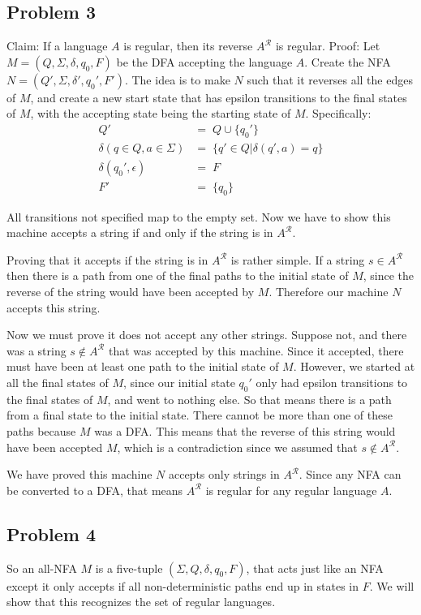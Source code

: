 \documentclass[english]{article}
\begin{document}
\subsection*{Problem 3}
Claim: If a language $A$ is regular, then its reverse $A^\mathcal{R}$ is regular.
Proof:
Let $M = (Q,\Sigma,\delta,q_0,F)$ be the DFA accepting the language $A$. Create the NFA $N = (Q',\Sigma,\delta',q_0',F')$. The idea is to make $N$ such that it reverses all the edges of $M$, and create a new start state that has epsilon transitions to the final states of $M$, with the accepting state being the starting state of $M$. Specifically:
\begin{align*}
                           Q' &=\; Q \cup \{q_0'\} \\
 \delta(q \in Q,a \in \Sigma) &=\; \{ q' \in Q | \delta(q',a) = q \} \\
        \delta(q_0',\epsilon) &=\; F \\
                           F' &=\; \{q_0\}
\end{align*}

All transitions not specified map to the empty set. Now we have to show this machine accepts a string if and only if the string is in $A^\mathcal{R}$.

Proving that it accepts if the string is in $A^\mathcal{R}$ is rather simple. If a string $s \in A^\mathcal{R}$ then there is a path from one of the final paths to the initial state of $M$, since the reverse of the string would have been accepted by $M$. Therefore our machine $N$ accepts this string.

Now we must prove it does not accept any other strings. Suppose not, and there was a string $s \notin A^\mathcal{R}$ that was accepted by this machine. Since it accepted, there must have been at least one path to the initial state of $M$. However, we started at all the final states of $M$, since our initial state $q_0'$ only had epsilon transitions to the final states of $M$, and went to nothing else. So that means there is a path from a final state to the initial state. There cannot be more than one of these paths because $M$ was a DFA. This means that the reverse of this string would have been accepted $M$, which is a contradiction since we assumed that $s \notin A^\mathcal{R}$.

We have proved this machine $N$ accepts only strings in $A^\mathcal{R}$. Since any NFA can be converted to a DFA, that means $A^\mathcal{R}$ is regular for any regular language $A$.

\subsection*{Problem 4}
So an all-NFA $M$ is a five-tuple $(\Sigma,Q,\delta,q_0,F)$, that acts just like an NFA except it only accepts if all non-deterministic paths end up in states in $F$. We will show that this recognizes the set of regular languages.
\end{document}
